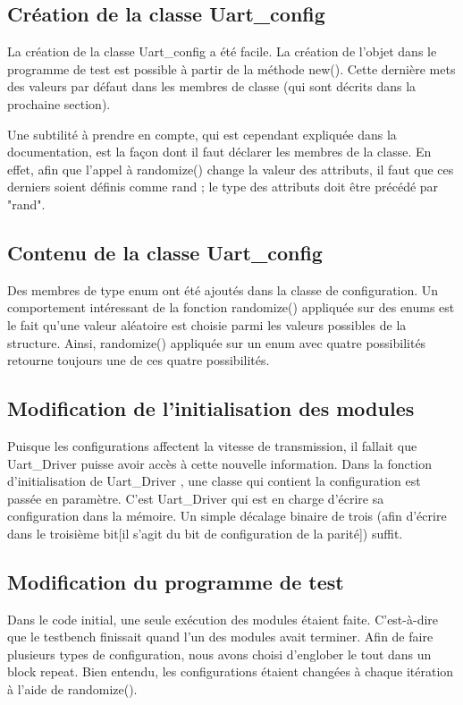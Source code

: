\documentclass[12pt, titlepage]{article}
\newcommand{\udriver}{Uart\_Driver }
\newcommand{\uconfig}{Uart\_config }
\begin{document}
    \subsection{Création de la classe \uconfig} 
    La création de la classe \uconfig a été facile. La création de l'objet dans le programme de test est possible à partir de la méthode new(). Cette dernière mets des valeurs par défaut dans les membres de classe (qui sont décrits dans la prochaine section).

    Une subtilité à prendre en compte, qui est cependant expliquée dans la documentation, est la façon dont il faut déclarer les membres de la classe. En effet, afin que l'appel à randomize() change la valeur des attributs, il faut que ces derniers soient définis comme rand ; le type des attributs doit être précédé par "rand".
    
    \subsection{Contenu de la classe \uconfig}
    Des membres de type enum ont été ajoutés dans la classe de configuration. Un comportement intéressant de la fonction randomize() appliquée sur des enums est le fait qu'une valeur aléatoire est choisie parmi les valeurs possibles de la structure. Ainsi, randomize() appliquée sur un enum avec quatre possibilités retourne toujours une de ces quatre possibilités.
    \subsection{Modification de l'initialisation des modules} 
    Puisque les configurations affectent la vitesse de transmission, il fallait que \udriver puisse avoir accès à cette nouvelle information. Dans la fonction d'initialisation de \udriver, une classe qui contient la configuration est passée en paramètre. C'est \udriver qui est en charge d'écrire sa configuration dans la mémoire. Un simple décalage binaire de trois (afin d'écrire dans le troisième bit[il s'agit du bit de configuration de la parité]) suffit.

    
    \subsection{Modification du programme de test}
    Dans le code initial, une seule exécution des modules étaient faite. C'est-à-dire que le testbench finissait quand l'un des modules avait terminer. Afin de faire plusieurs types de configuration, nous avons choisi d'englober le tout dans un block repeat. Bien entendu, les configurations étaient changées à chaque itération à l'aide de randomize().
\end{document}
